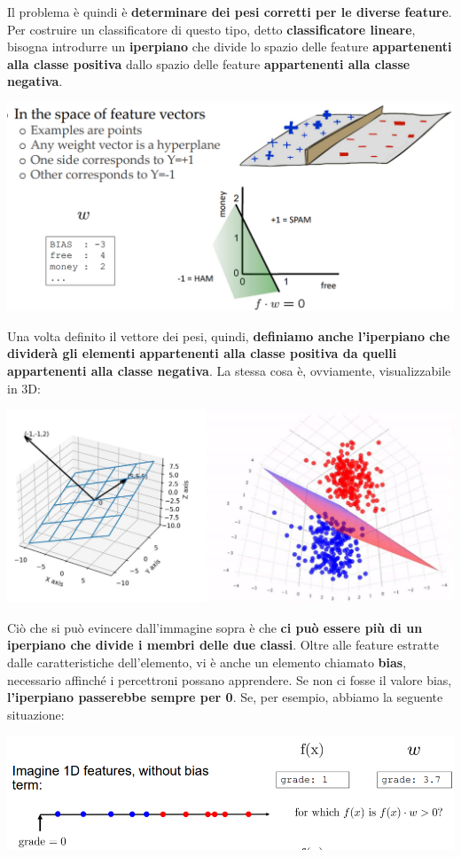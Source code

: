 \documentclass[12pt]{article}
\begin{document}
Il problema è quindi è \textbf{determinare dei pesi corretti per le diverse feature}.
Per costruire un classificatore di questo tipo, detto \textbf{classificatore lineare}, bisogna introdurre un \textbf{iperpiano} che divide
lo spazio delle feature \textbf{appartenenti alla classe positiva} dallo spazio delle feature \textbf{appartenenti alla classe negativa}.
\begin{center}
    \includegraphics[width = 1\linewidth]{Images/90.PNG}
\end{center}
Una volta definito il vettore dei pesi, quindi, \textbf{definiamo anche l'iperpiano che dividerà gli elementi appartenenti alla classe positiva da quelli appartenenti alla classe negativa}.
La stessa cosa è, ovviamente, visualizzabile in 3D:
\begin{center}
    \includegraphics[width =0.80\linewidth]{Images/91.PNG}
\end{center}
Ciò che si può evincere dall'immagine sopra è che \textbf{ci può essere più di un iperpiano che divide i membri delle due classi}.
Oltre alle feature estratte dalle caratteristiche dell'elemento, vi è anche un elemento chiamato \textbf{bias}, necessario affinché i percettroni possano apprendere.
Se non ci fosse il valore bias, \textbf{l'iperpiano passerebbe sempre per 0}.
Se, per esempio, abbiamo la seguente situazione:
\begin{center}
    \includegraphics[width =1\linewidth]{Images/92.PNG}
\end{center}
\end{document}

